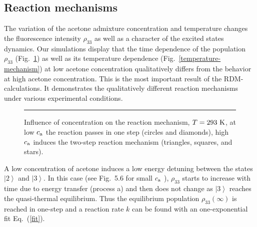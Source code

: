 \documentclass[12pt,twoside,a4paper]{report}
\begin{document}
\subsection{Reaction mechanisms} \label{PhysProc.1}
 The variation of the 
acetone admixture concentration
and temperature changes 
the fluorescence intensity $\rho_{33}$ as well as a character of 
the excited states dynamics. Our simulations display that the time 
dependence of the population $\rho_{33}$ 
(Fig.~\ref{conc-A}) 
as well as its temperature dependence (Fig.~\ref{temperature-mechanism}) at 
low   acetone concentration qualitatively differs from the behavior at 
high acetone concentration. This is the most important result of 
the RDM-calculations. 
It demonstrates the qualitatively different reaction 
mechanisms 
under
various experimental conditions. 
\begin{footnotesize}\begin{figure}[!h]
\begin{center}
\parbox{5cm}
{\rule{-3cm}{0cm}\epsfxsize=9cm
}
\end{center}
\caption[Influence of concentration on the reaction mechanism]
{\small 
\label{conc-A}
Influence of concentration on the reaction mechanism, $T=293~{\rm K}$, at low 
$c_{\rm a}$ the reaction passes in one step (circles and diamonds), 
high $c_{\rm a}$ induces the two-step reaction mechanism (triangles, squares, and stars).
}
\end{figure}\end{footnotesize} \normalsize





A low {concentration of acetone induces a }low energy detuning between the states
$\left| 2 \right\rangle $ and $\left| 3\right\rangle $. 
In this case 
(see Fig.~5.6
for small $c_{\rm a}$
), 
$\rho_{33}$
starts to
increase with time due to energy transfer 
(process a) 
and then does not change
 as $\left| 3\right\rangle $ reaches  
the quasi-thermal equilibrium. 
Thus the equilibrium population 
$\rho_{33}(\infty)$
is reached in one-step and 
a reaction rate $k$ can be found with  
an one-exponential fit Eq.~(\ref{fit}). 
\end{document}
